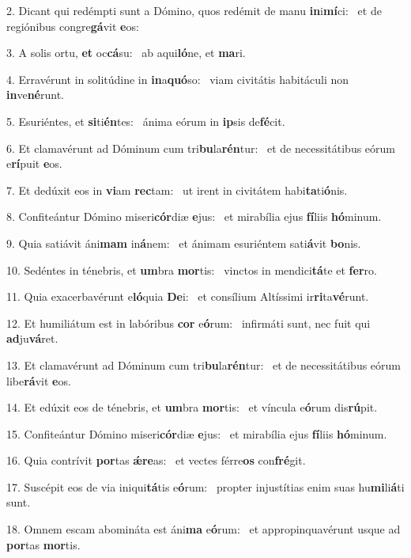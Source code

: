 2. Dicant qui redémpti sunt a Dómino, quos redémit de manu \textbf{in}i\textbf{mí}ci: \ast\  et de regiónibus congre\textbf{gá}vit \textbf{e}os:\

3. A solis ortu, \textbf{et} oc\textbf{cá}su: \ast\  ab aqui\textbf{ló}ne, et \textbf{ma}ri.\

4. Erravérunt in solitúdine in \textbf{in}a\textbf{quó}so: \ast\  viam civitátis habitáculi non \textbf{in}ve\textbf{né}runt.\

5. Esuriéntes, et \textbf{si}ti\textbf{én}tes: \ast\  ánima eórum in \textbf{ip}sis de\textbf{fé}cit.\

6. Et clamavérunt ad Dóminum cum tri\textbf{bu}la\textbf{rén}tur: \ast\  et de necessitátibus eórum e\textbf{rí}puit \textbf{e}os.\

7. Et dedúxit eos in \textbf{vi}am \textbf{rec}tam: \ast\  ut irent in civitátem habi\textbf{ta}ti\textbf{ó}nis.\

8. Confiteántur Dómino miseri\textbf{cór}diæ \textbf{e}jus: \ast\  et mirabília ejus \textbf{fí}liis \textbf{hó}minum.\

9. Quia satiávit áni\textbf{mam} in\textbf{á}nem: \ast\  et ánimam esuriéntem sati\textbf{á}vit \textbf{bo}nis.\

10. Sedéntes in ténebris, et \textbf{um}bra \textbf{mor}tis: \ast\  vinctos in mendici\textbf{tá}te et \textbf{fer}ro.\

11. Quia exacerbavérunt e\textbf{ló}quia \textbf{De}i: \ast\  et consílium Altíssimi ir\textbf{ri}ta\textbf{vé}runt.\

12. Et humiliátum est in labóribus \textbf{cor} e\textbf{ó}rum: \ast\  infirmáti sunt, nec fuit qui \textbf{ad}ju\textbf{vá}ret.\

13. Et clamavérunt ad Dóminum cum tri\textbf{bu}la\textbf{rén}tur: \ast\  et de necessitátibus eórum libe\textbf{rá}vit \textbf{e}os.\

14. Et edúxit eos de ténebris, et \textbf{um}bra \textbf{mor}tis: \ast\  et víncula e\textbf{ó}rum dis\textbf{rú}pit.\

15. Confiteántur Dómino miseri\textbf{cór}diæ \textbf{e}jus: \ast\  et mirabília ejus \textbf{fí}liis \textbf{hó}minum.\

16. Quia contrívit \textbf{por}tas \textbf{ǽ}\textbf{re}as: \ast\  et vectes férre\textbf{os} con\textbf{fré}git.\

17. Suscépit eos de via iniqui\textbf{tá}tis e\textbf{ó}rum: \ast\  propter injustítias enim suas hu\textbf{mi}li\textbf{á}ti sunt.\

18. Omnem escam abomináta est áni\textbf{ma} e\textbf{ó}rum: \ast\  et appropinquavérunt usque ad \textbf{por}tas \textbf{mor}tis.\

